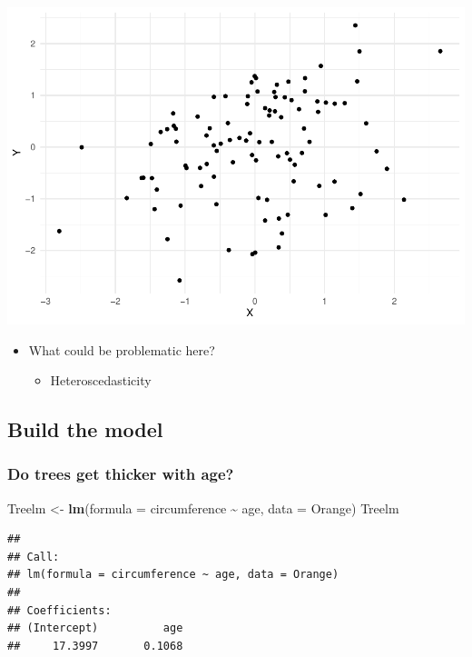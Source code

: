\documentclass[
]{book}
\newenvironment{Shaded}{\begin{snugshade}}{\end{snugshade}}
\newcommand{\AttributeTok}[1]{\textcolor[rgb]{0.13,0.29,0.53}{#1}}
\newcommand{\FunctionTok}[1]{\textcolor[rgb]{0.13,0.29,0.53}{\textbf{#1}}}
\newcommand{\NormalTok}[1]{#1}
\newcommand{\OtherTok}[1]{\textcolor[rgb]{0.56,0.35,0.01}{#1}}
\newcommand{\SpecialCharTok}[1]{\textcolor[rgb]{0.81,0.36,0.00}{\textbf{#1}}}
\providecommand{\tightlist}{%
  \setlength{\itemsep}{0pt}\setlength{\parskip}{0pt}}
\begin{document}
\includegraphics{_main_files/figure-latex/unnamed-chunk-75-1.pdf}

\begin{itemize}
\tightlist
\item
  What could be problematic here?

  \begin{itemize}
  \tightlist
  \item
    Heteroscedasticity
  \end{itemize}
\end{itemize}

\subsection{Build the model}\label{build-the-model-1}

\subsubsection{Do trees get thicker with age?}\label{do-trees-get-thicker-with-age}

\begin{Shaded}
\begin{Highlighting}[]
\NormalTok{Treelm }\OtherTok{\textless{}{-}} \FunctionTok{lm}\NormalTok{(}\AttributeTok{formula =}\NormalTok{ circumference }\SpecialCharTok{\textasciitilde{}}\NormalTok{ age, }\AttributeTok{data =}\NormalTok{ Orange)}
\NormalTok{Treelm}
\end{Highlighting}
\end{Shaded}

\begin{verbatim}
## 
## Call:
## lm(formula = circumference ~ age, data = Orange)
## 
## Coefficients:
## (Intercept)          age  
##     17.3997       0.1068
\end{verbatim}
\end{document}
